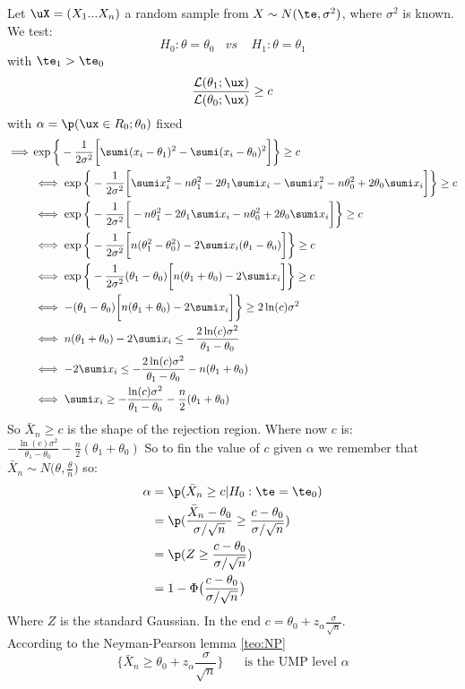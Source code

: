 \begin{eg}
	Let $\uX=(X_1 ... X_n)$ a random sample from $X\sim N(\te, \sigma^2)$, where $\sigma^2$ is known. We test:
	$$H_0: \theta= \theta_0 \ \ \ \ vs\ \ \ \ \ H_1: \theta= \theta_1 $$
	with $\te_1>\te_0$ \\
	$$\frac{\mathcal{L}(\theta_1;\ux)}{\mathcal{L}(\theta_0;\ux)}\geq c$$
	with $\alpha=\p(\ux \in R_0;\theta_0)$ fixed\\
	
	\[
	\begin{split}
	\implies 
	&
	\exp \bigg\{ -\frac{1}{2\sigma^2}\bigg[ \sumi (x_i- \theta_1)^2 - \sumi(x_i-\theta_0)^2 \bigg] \bigg\} \geq c \\
	&\iff \exp \bigg\{ -\frac{1}{2\sigma^2}\bigg[ \sumi x_i^2 - n\theta^2_1 -2\theta_1\sumi x_i-\sumi x_i^2 - n \theta_0^2 + 2\theta_0 \sumi x_i \bigg] \bigg\} \geq c\\
	&\iff \exp \bigg\{ -\frac{1}{2\sigma^2}\bigg[ - n\theta^2_1 -2\theta_1\sumi x_i - n \theta_0^2 + 2\theta_0 \sumi x_i \bigg] \bigg\} \geq c\\
	&\iff \exp \bigg\{ -\frac{1}{2\sigma^2}\bigg[ n(\theta_1^2 -\theta_0^2)- 2 \sumi x_i (\theta_1 - \theta_0) \bigg] \bigg\} \geq c\\
	&\iff \exp \bigg\{ -\frac{1}{2\sigma^2}(\theta_1 - \theta_0)\bigg[ n(\theta_1 +\theta_0)- 2 \sumi x_i \bigg] \bigg\} \geq c\\
	&\iff -(\theta_1 - \theta_0)\bigg[ n(\theta_1 +\theta_0)- 2 \sumi x_i \bigg] \bigg\} \geq 2\ln(c)\sigma^2\\
	&\iff  n(\theta_1 +\theta_0)- 2 \sumi x_i \leq - \frac{2\ln(c)\sigma^2}{\theta_1-\theta_0}\\
	&\iff -2 \sumi x_i \leq  - \frac{2\ln(c)\sigma^2}{\theta_1-\theta_0} -  n(\theta_1 +\theta_0)\\
	&\iff  \sumi x_i \geq  - \frac{\ln(c)\sigma^2}{\theta_1-\theta_0} -  \frac{n}{2}(\theta_1 +\theta_0)
	\end{split}
	\]
	So $\bar X_n \geq c$ is the shape of the rejection region. Where now $c$ is: $- \frac{\ln(c)\sigma^2}{\theta_1-\theta_0} -  \frac{n}{2}(\theta_1 +\theta_0)$  So to fin the value of $c$ given $\alpha$ we remember that $\bar X_n\sim N\big( \theta, \frac{\theta}{n} \big)$ so:
	\[
		\begin{split}
		\alpha&=\p(\bar X_n \geq c| H_0: \te =\te_0)\\&=\p(\frac{\bar X_n-\theta_0}{\sigma/\sqrt{n}}\geq \frac{c-\theta_0}{\sigma/\sqrt{n}})\\&=\p(Z \geq \frac{c-\theta_0}{\sigma/\sqrt{n}})\\&=1- \Phi\big( \frac{c-\theta_0}{\sigma/\sqrt{n}} \big)
		\end{split}
	\]
	Where $Z$ is the standard Gaussian.
	In the end $c=\theta_0 + z_{\alpha} \frac{\sigma}{\sqrt{n}}$.\\
	According to the Neyman-Pearson lemma \ref{teo:NP}
	$$\big\{ \bar X_n \geq \theta_0 + z_\alpha \frac{\sigma}{\sqrt{n}} \big\} \ \ \ \ \ \ \text{ is the UMP level $\alpha$}$$
\end{eg}
